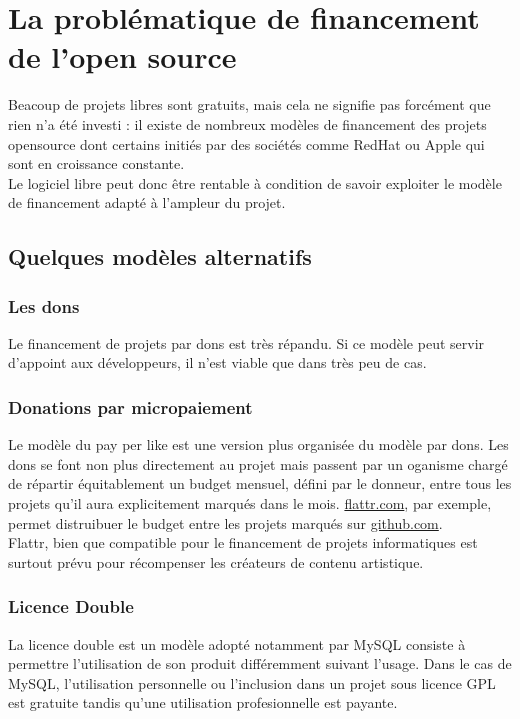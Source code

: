 \chapter{La problématique de financement de l'open source}

Beacoup de projets libres sont gratuits, mais cela ne signifie pas forcément que
rien n'a été investi : il existe de nombreux modèles de financement des projets
opensource dont certains initiés par des sociétés comme RedHat ou Apple qui sont
en croissance constante.\\
Le logiciel libre peut donc être rentable à condition de savoir exploiter
le modèle de financement adapté à l'ampleur du projet.

\section{Quelques modèles alternatifs}

    \subsection{Les dons}

Le financement de projets par dons est très répandu.
Si ce modèle peut servir d'appoint aux développeurs, il n'est viable que dans
très peu de cas.
    
    \subsection{Donations par micropaiement}

Le modèle du pay per like est une version plus organisée du modèle par dons. Les
dons se font non plus directement au projet mais passent par un oganisme chargé
de répartir équitablement un budget mensuel, défini par le donneur, entre tous
les projets qu'il aura explicitement marqués dans le mois.
\url{flattr.com}, par exemple, permet distruibuer le budget entre les projets
marqués sur \url{github.com}.\\
Flattr, bien que compatible pour le financement de projets informatiques est
surtout prévu pour récompenser les créateurs de contenu artistique.

    \subsection{Licence Double}

La licence double est un modèle adopté notamment par MySQL consiste à permettre
l'utilisation de son produit différemment suivant l'usage. Dans le cas de MySQL,
l'utilisation personnelle ou l'inclusion dans un projet sous licence GPL est
gratuite tandis qu'une utilisation profesionnelle est payante.

